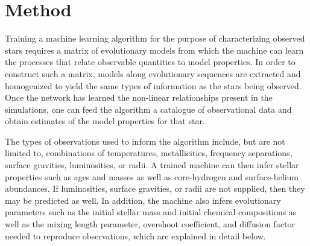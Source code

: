 \documentclass[manuscript]{aastex}
\begin{document}
\section{Method} \label{sec:Method} 
Training a machine learning algorithm for the purpose of characterizing observed stars requires a matrix of evolutionary models from which the machine can learn the processes that relate observable quantities to model properties. In order to construct such a matrix, models along evolutionary sequences are extracted and homogenized to yield the same types of information as the stars being observed. Once the network has learned the non-linear relationships present in the simulations, one can feed the algorithm a catalogue of observational data and obtain estimates of the model properties for that star. 

The types of observations used to inform the algorithm include, but are not limited to, combinations of temperatures, metallicities, frequency separations, surface gravities, luminosities, or radii. A trained machine can then infer stellar properties such as ages and masses as well as core-hydrogen and surface-helium abundances. If luminosities, surface gravities, or radii are not supplied, then they may be predicted as well. In addition, the machine also infers evolutionary parameters such as the initial stellar mass and initial chemical compositions as well as the mixing length parameter, overshoot coefficient, and diffusion factor needed to reproduce observations, which are explained in detail below. %
\end{document}
